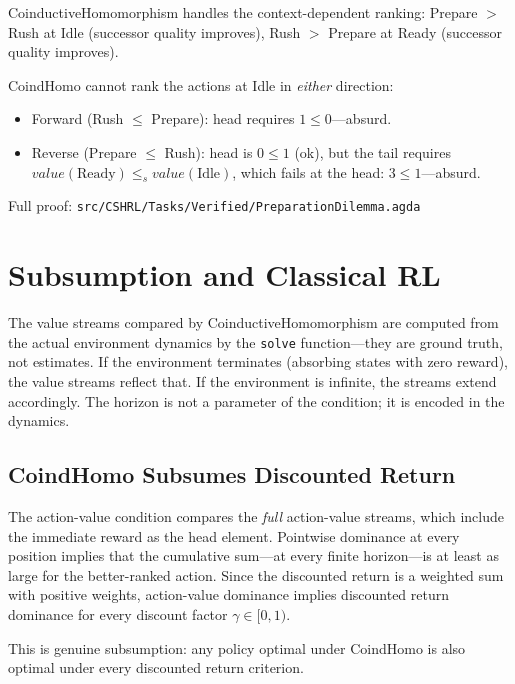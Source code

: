 \documentclass[9pt,a4paper]{article}
\newcommand{\fpath}[1]{\nolinkurl{#1}}
\theoremstyle{plain}
\theoremstyle{definition}
\theoremstyle{remark}
\begin{document}
CoinductiveHomomorphism handles the context-dependent ranking: Prepare $>$ Rush at Idle (successor quality improves), Rush $>$ Prepare at Ready (successor quality improves).

CoindHomo cannot rank the actions at Idle in \emph{either} direction:
\begin{itemize}
\item Forward (Rush $\le$ Prepare): head requires $1 \le 0$---absurd.
\item Reverse (Prepare $\le$ Rush): head is $0 \le 1$ (ok), but the tail requires $\mathit{value}(\text{Ready}) \le_s \mathit{value}(\text{Idle})$, which fails at the head: $3 \le 1$---absurd.
\end{itemize}

Full proof: \fpath{src/CSHRL/Tasks/Verified/PreparationDilemma.agda}


\section{Subsumption and Classical RL}\label{sec:subsumes}

The value streams compared by CoinductiveHomomorphism are computed from the actual environment dynamics by the \texttt{solve} function---they are ground truth, not estimates.  If the environment terminates (absorbing states with zero reward), the value streams reflect that.  If the environment is infinite, the streams extend accordingly.  The horizon is not a parameter of the condition; it is encoded in the dynamics.

\subsection{CoindHomo Subsumes Discounted Return}

The action-value condition compares the \emph{full} action-value streams, which include the immediate reward as the head element.  Pointwise dominance at every position implies that the cumulative sum---at every finite horizon---is at least as large for the better-ranked action.  Since the discounted return is a weighted sum with positive weights, action-value dominance implies discounted return dominance for every discount factor $\gamma \in [0,1)$.

This is genuine subsumption: any policy optimal under CoindHomo is also optimal under every discounted return criterion.
\end{document}
